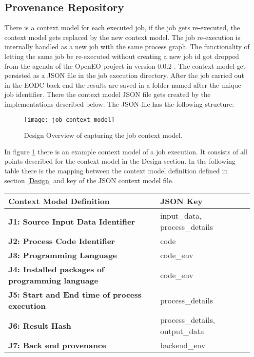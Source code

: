 \documentclass[draft,final]{vutinfth} %
\begin{document}
\subsection{Provenance Repository}\label{Implementation:Provenance Repository}
There is a context model for each executed job, if the job gets re-executed, the context model gets replaced by the new context model. The job re-execution is internally handled as a new job with the same process graph. The functionality of letting the same job be re-executed without creating a new job id got dropped from the agenda of the OpenEO project in version 0.0.2 \cite{openeo}. 
The context model get persisted as a JSON file in the job execution directory. After the job carried out in the EODC back end the results are saved in a folder named after the unique job identifier. There the context model JSON file gets created by the implementations described below. The JSON file has the following structure:

\begin{figure}[h]
	\centering
	\texttt{[image: job\_context\_model]}
	\caption{Design Overview of capturing the job context model.}
	\label{fig:job_context_model} %
\end{figure}

In figure \ref{fig:job_context_model} there is an example context model of a job execution. It consists of all points described for the context model in the Design section. In the following table there is the mapping between the context model definition defined in section \ref{Design} and key of the JSON context model file. 

\begin{table}[]
	\begin{tabular}{l|l}
		\textbf{Context Model Definition} & \textbf{JSON Key} \\ \hline
		\textbf{J1:  Source Input Data Identifier} & input\_data, process\_details \\ \hline
		\textbf{J2: Process Code Identifier} & code \\ \hline
		\textbf{J3: Programming Language} & code\_env \\ \hline
		\textbf{J4: Installed packages of programming language} & code\_env \\ \hline
		\textbf{J5: Start and End time of process execution} & process\_details \\ \hline
		\textbf{J6: Result Hash} & process\_details, output\_data \\ \hline
		\textbf{J7: Back end provenance} & backend\_env \\ 
	\end{tabular}
\end{table}
\end{document}
